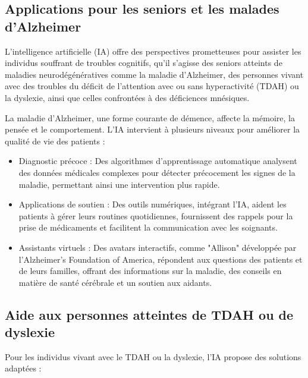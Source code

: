 \documentclass[12pt,a4paper]{report}
\begin{document}
\subsection{Applications pour les seniors et les malades d'Alzheimer}

L'intelligence artificielle (IA) offre des perspectives prometteuses pour assister les individus souffrant de troubles cognitifs, qu'il s'agisse des seniors atteints de maladies neurodégénératives comme la maladie d'Alzheimer, des personnes vivant avec des troubles du déficit de l'attention avec ou sans hyperactivité (TDAH) ou la dyslexie, ainsi que celles confrontées à des déficiences mnésiques.

La maladie d'Alzheimer, une forme courante de démence, affecte la mémoire, la pensée et le comportement. L'IA intervient à plusieurs niveaux pour améliorer la qualité de vie des patients :

\begin{itemize}
    \item Diagnostic précoce : Des algorithmes d'apprentissage automatique analysent des données médicales complexes pour détecter précocement les signes de la maladie, permettant ainsi une intervention plus rapide.

    \item Applications de soutien : Des outils numériques, intégrant l'IA, aident les patients à gérer leurs routines quotidiennes, fournissent des rappels pour la prise de médicaments et facilitent la communication avec les soignants.

    \item Assistants virtuels : Des avatars interactifs, comme "Allison" développée par l'Alzheimer's Foundation of America, répondent aux questions des patients et de leurs familles, offrant des informations sur la maladie, des conseils en matière de santé cérébrale et un soutien aux aidants. 

\end{itemize}

\subsection{Aide aux personnes atteintes de TDAH ou de dyslexie}

Pour les individus vivant avec le TDAH ou la dyslexie, l'IA propose des solutions adaptées :
\end{document}
